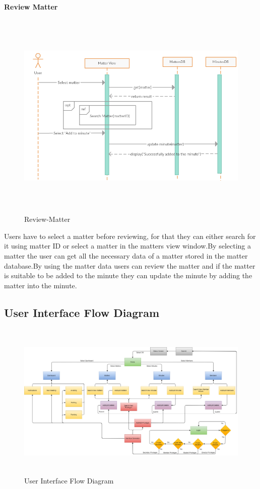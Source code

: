 \documentclass[a4paper,beamer]{article}
\begin{document}
		\textbf{Review Matter}\newline
		\begin{figure}[h!]
			\begin{center}
			\includegraphics[width=6in,height=4in]{img/seq-review-matter}
			\end{center}
			\caption{Review-Matter}
			\label{fig:review-matter}
		\end{figure}
		        
		Users have to select a matter before reviewing, for that they can either search for it using matter ID or select a matter in the matters view window.By selecting a matter the user can get all the necessary data of a matter stored in the matter database.By using the matter data users can review the matter and if the matter is suitable to be added to the minute they can update the minute by adding the matter into the minute.
		
		\newpage
	
	\subsection{User Interface Flow Diagram}
		\vspace{2cm}
		\begin{figure}[h!]
			\begin{center}
			\includegraphics[width=6in,height=3in]{img/user-interface-flow}
			\end{center}
			\caption{User Interface Flow Diagram}
			\label{fig:user-interface-flow}
		\end{figure}
		\newpage
		
\end{document}

